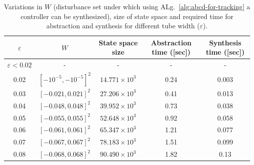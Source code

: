 \begin{table}[h!]
	\centering
	\caption{Variations in $W$ (disturbance set under which using ALg.~\ref{alg:abcd-for-tracking} a controller can be synthesized), size of state space and required time for abstraction and synthesis for different tube width ($\varepsilon$).}
	\vspace{1mm}
	\begin{tabular}{|c|c|c|c|c|}
		\hline
		$\varepsilon$ &  $W$  & State space size & Abstraction time ([sec])  & Synthesis time ([sec])\\
		\hline
		$\varepsilon<0.02$  & -    & -  & -  &-\\
		\hline
		0.02   & $[-10^{-5},-10^{-5}]^2$    & $14.771\times 10^3$  & 0.24  &0.003\\
		\hline
		0.03   & $[-0.021,0.021]^2$   & $27.206 \times 10^3$ & 0.41  &0.013\\
		\hline
		0.04    & $[-0.048,0.048]^2$  & $39.952\times 10^3$  & 0.73  &0.038\\
		\hline
		0.05  &  $[-0.055,0.055]^2$   & $52.648 \times 10^3$  & 0.92 &0.058 \\
		\hline
		0.06    & $[-0.061,0.061]^2$  & $65.347 \times 10^3$  & 1.21  &0.077\\
		\hline
		0.07   &$[-0.067,0.067]^2$  & $78.183 \times 10^3$     & 1.51 &0.099\\
		\hline
		0.08   &$[-0.068,0.068]^2$  & $90.490 \times 10^3$     & 1.82 &0.13\\
		\hline
	\end{tabular}
	\label{tab:inv_pend}
\end{table}
